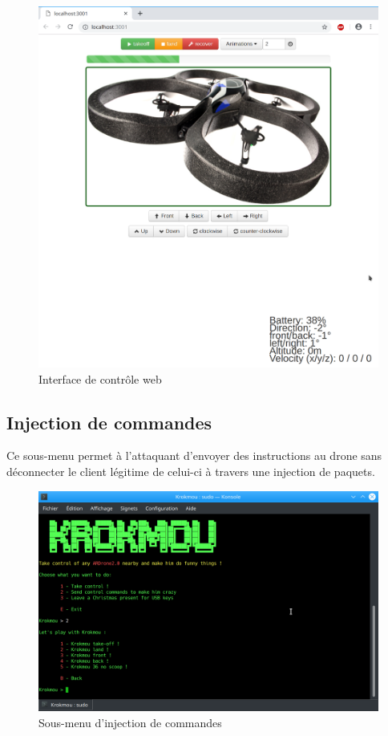 \begin{figure}[H]
  \centering
  \includegraphics[scale=0.3]{images/control_application.png}
  \caption{Interface de contrôle web}
\end{figure}

\subsection{Injection de commandes}
Ce sous-menu permet à l'attaquant d'envoyer des instructions au drone sans déconnecter le client légitime de celui-ci à travers une injection de paquets.

\begin{figure}[H]
  \centering
  \includegraphics[scale=0.3]{images/injection.png}
  \caption{Sous-menu d'injection de commandes}
\end{figure}

